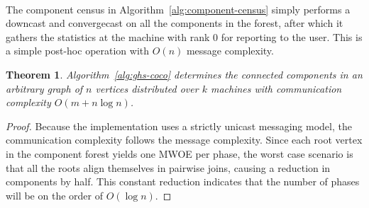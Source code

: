 \documentclass[11pt,epsf]{article}
\newtheorem{theorem}{Theorem}
\begin{document}
{{{\begin{algorithm}
\begin{algorithmic}
{            

            \ENDFOR
          }\ENDWHILE

          \ENDFOR
          \ENDFOR
        \end{algorithmic}
      \end{algorithm}
    }
    \paragraph{}{
      The component census in Algorithm~\ref{alg:component-census} simply performs a downcast and
      convergecast on all the components in the forest, after which it gathers the statistics
      at the machine with rank 0 for reporting to the user. This is a simple post-hoc operation
      with $O(n)$ message complexity.
    }

    \begin{theorem}
      \label{thm:ghs-coco}
      Algorithm~\ref{alg:ghs-coco} determines the connected components in an arbitrary graph
      of $n$ vertices distributed over $k$ machines with communication complexity $O(m + n \log n)$.
    \end{theorem}
    \begin{proof}
      Because the implementation uses a strictly unicast messaging model, the communication complexity
      follows the message complexity. Since each root vertex in the component forest yields
      one MWOE per phase, the worst case scenario is that all the roots align themselves
      in pairwise joins, causing a reduction in components by half. This constant reduction
      indicates that the number of phases will be on the order of $O(\log n)$.

\end{proof}}}
\end{document}
